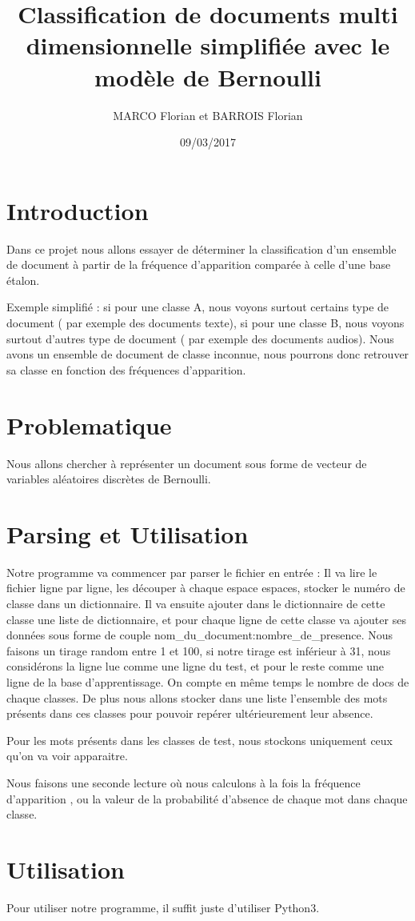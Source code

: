 \documentclass[a4paper,11pt]{article}
\title{Classification de documents multi dimensionnelle simplifiée avec le modèle de Bernoulli}
\author{MARCO Florian et BARROIS Florian}
\date{09/03/2017}
\begin{document}
\maketitle

\section{Introduction}

Dans ce projet nous allons essayer de déterminer la classification d'un ensemble de document à partir de la fréquence d'apparition comparée à celle d'une base étalon.

Exemple simplifié : si pour une classe A, nous voyons surtout certains type de document ( par exemple des documents texte), si pour une classe B, nous voyons surtout d'autres type de document ( par exemple des documents audios). 
Nous avons un ensemble de document de classe inconnue, nous pourrons donc retrouver sa classe en fonction des fréquences d'apparition.

\section{Problematique}

Nous allons chercher à représenter un document sous forme de vecteur de variables aléatoires discrètes de Bernoulli. 

\section{Parsing et Utilisation}

Notre programme va commencer par parser le fichier en entrée :
Il va lire le fichier ligne par ligne, les découper à chaque espace espaces, stocker le numéro de classe dans un dictionnaire.
Il va ensuite ajouter dans le dictionnaire de cette classe une liste de dictionnaire, et pour chaque ligne de cette classe va ajouter ses données sous forme de couple nom_du_document:nombre_de_presence.
Nous faisons un tirage random entre 1 et 100, si notre tirage est inférieur à 31, nous considérons la ligne lue comme une ligne du test, et pour le reste comme une ligne de la base d'apprentissage. On compte en même temps le nombre de docs de chaque classes.  De plus nous allons stocker dans une liste l'ensemble des mots présents dans ces classes pour pouvoir repérer ultérieurement leur absence.

Pour les mots présents dans les classes de test, nous stockons uniquement ceux qu'on va voir apparaitre.

Nous faisons une seconde lecture où nous calculons à la fois la fréquence d'apparition , ou la valeur de la probabilité d'absence de chaque mot dans chaque classe.


\section{Utilisation}

Pour utiliser notre programme, il suffit juste d'utiliser Python3.
\end{document}
